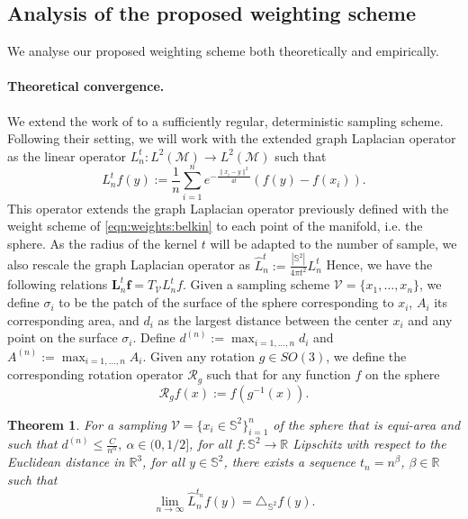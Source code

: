 \documentclass{article} %
\newtheorem{theorem}{Theorem}[section]
\renewcommand{\b}[1]{{\bm{#1}}}  %
\newcommand{\R}{\mathbb{R}}
\renewcommand{\S}{\mathbb{S}}
\newcommand{\V}{\mathcal{V}}  %
\newcommand{\nati}[1]{{\color[rgb]{.3,.5,.9}{#1}}}
\newcommand{\linefrac}[2]{
    {#1/#2}
}
\begin{document}
\subsection{Analysis of the proposed weighting scheme}
We analyse our proposed weighting scheme both theoretically and empirically.

\paragraph{Theoretical convergence.}
We extend the work of \citep{belkin2005towards} to a sufficiently regular, deterministic sampling scheme.
Following their setting, we will work with the extended graph Laplacian operator as the linear operator $L_n^t: L^{2}(\mathcal{M}) \rightarrow L^{2}(\mathcal{M})$ such that
	\begin{equation}
	\label{eq:Heat Kernel Graph Laplacian operator}
	 L_n^t f(y) := \frac{1}{n}\sum_{i=1}^{n} e^{ -\frac{\|x_i-y\|^2}{4t}} \left(f(y)-f(x_i)\right).
	\end{equation}
This operator extends the graph Laplacian operator previously defined with the weight scheme of \eqref{eqn:weights:belkin} to each point of the manifold, i.e. the sphere.
As the radius of the kernel $t$ will be adapted to the number of sample, we also rescale the graph Laplacian operator as
	 $\hat{L}_n^t := \frac{|\mathbb S^2|}{4\pi t^2}L_n^t$
Hence, we have the following relations $\b{L}_n^t \b{f} = T_\V L_n^t f$.
Given a sampling scheme $\V = \{x_1, \dots, x_n\}$, we define $\sigma_i$ to be the patch of the surface of the sphere corresponding to $x_i$, $A_i$ its corresponding area, and $d_i$ as the largest distance between the center $x_i$ and any point on the surface $\sigma_i$.
Define $d^{(n)} := \max_{i=1, \dots, n} d_i$ and $A^{(n)} := \max_{i=1, \dots, n} A_i$.
Given any rotation $g\in SO(3)$, we define the corresponding rotation operator $\mathcal R_g$ such that for any function $f$ on the sphere
\begin{equation}\label{eq:rotation operator}
	\mathcal R_g f(x) := f(g^{-1}(x)).
\end{equation}
\begin{theorem}
	For a sampling $\V = \{x_i\in\S^2\}_{i=1}^n$ of the sphere that is equi-area and such that $d^{(n)} \leq \frac{C}{n^\alpha}, \ \alpha\in (0,\linefrac{1}{2}]$, for all $f: \S^2 \rightarrow \R$ Lipschitz with respect to the Euclidean distance in $\R^3$, for all $y\in\S^2$, there exists a sequence $t_n = n^\beta$, $\beta\in\mathbb R$ such that
	\begin{equation*}
		\lim_{n\to\infty}\hat{L}_n^{t_n}f(y) = \triangle_{\S^2}f(y).
	\end{equation*}
	\label{theo:pointwise convergence for a regular sampling}
\end{theorem}
\end{document}
